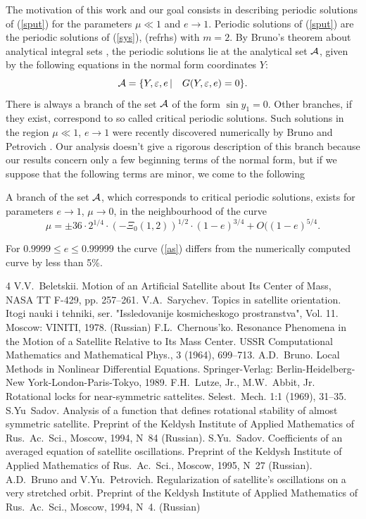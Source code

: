 \bigskip{}
The motivation of this work and our goal consists
in describing periodic solutions of (\ref{sput})
for the parameters $\mu\ll1$ and $e\to1$.
Periodic solutions of (\ref{sput}) are
the periodic solutions of (\ref{sys}), (ref{rhs})
with $m=2$.
By Bruno's theorem about analytical integral sets
\cite[Ch.~III,\S\,3]{Bru}, the periodic solutions
lie at the analytical set $\cal A$, given by the
following equations in the normal form coordinates $Y$:
$$
{\cal A}=\{Y,\varepsilon,e\,|\quad G(Y,\varepsilon,e)=0\}.
$$
There is always a branch of the set $\cal A$
of the form $\sin y_1=0$. Other branches,
if they exist, correspond to so called critical periodic
solutions.
Such solutions in the region $\mu\ll1$, $e\to1$ were
recently
discovered numerically by Bruno and Petrovich \cite{bpmid}.
Our analysis doesn't give a rigorous description of
this branch because our results concern only
a few beginning terms of the normal form, but
if we suppose that the following terms are minor,
we come to the following
\begin{cnj}
A branch of the set $\cal A$, which corresponds
to critical periodic solutions, exists for
parameters $e\to1$, $\mu\to0$, in the neighbourhood
of the curve
\begin{equation}
\label{as}
\mu=\pm 36\cdot 2^{1/4}\cdot\left(-\Xi_0(1,2)\right)^{1/2}\cdot
(1-e)^{3/4} +O((1-e)^{5/4}.
\end{equation}
\end{cnj}

For $0.9999\leq e\leq 0.99999$ the curve (\ref{as})
differs from the numerically computed curve \cite{bpmid}
by less than 5\%.
\begin{thebibliography}{4}
%
V.V.\ Beletskii.
Motion of an Artificial Satellite about Its Center of Mass,
NASA TT F-429,
pp. 257--261.
%
V.A.\ Sarychev.
Topics in satellite orientation.
Itogi nauki i tehniki, ser. "Issledovanije kosmicheskogo
prostranstva", Vol. 11. Moscow: VINITI, 1978.
(Russian)
%
F.L.\ Chernous'ko.
Resonance Phenomena in the Motion of
a Satellite Relative to Its Mass Center.
USSR Computational Mathematics and Mathematical Phys., 3 (1964),
699--713.
%
A.D.\ Bruno.
Local Methods in Nonlinear Differential Equations.
Springer-Verlag: Berlin-Heidelberg-New York-London-Paris-Tokyo,
1989.
%
 F.H.~Lutze, Jr., M.W.~Abbit, Jr. Rotational locks
     for near-symmetric sattelites. Selest.\ Mech. 1:1 (1969),
      31--35.
 S.Yu\ Sadov. Analysis of a function that
defines rotational stability of almost symmetric satellite.
     Preprint of the Keldysh Institute of Applied Mathematics
of Rus.\ Ac.\ Sci., Moscow, 1994, N\ 84 (Russian).
 S.Yu.\ Sadov.
    Coefficients of an averaged equation of satellite
     oscillations.
     Preprint of the Keldysh Institute of Applied Mathematics
of Rus.\ Ac.\ Sci., Moscow, 1995, N\ 27 (Russian).
 A.D.~Bruno and V.Yu.~Petrovich.
     Regularization of satellite's oscillations on a very
     stretched orbit.
     Preprint of the Keldysh Institute of Applied Mathematics
of Rus.\ Ac.\ Sci., Moscow, 1994, N\ 4. (Russian)
\end{thebibliography}

